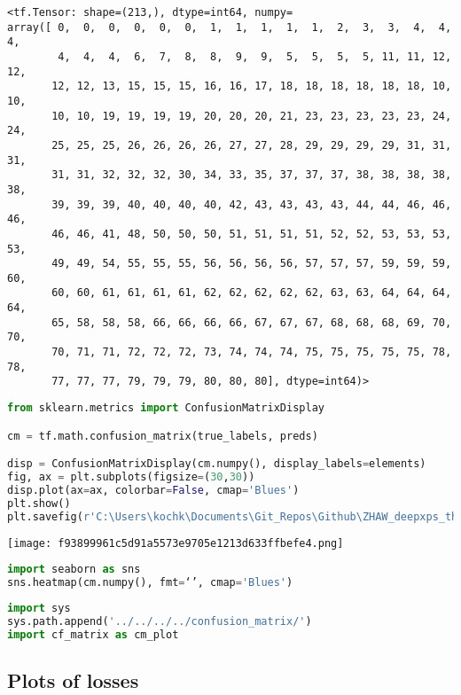 \begin{lstlisting}
<tf.Tensor: shape=(213,), dtype=int64, numpy=
array([ 0,  0,  0,  0,  0,  0,  1,  1,  1,  1,  1,  2,  3,  3,  4,  4,  4,
        4,  4,  4,  6,  7,  8,  8,  9,  9,  5,  5,  5,  5, 11, 11, 12, 12,
       12, 12, 13, 15, 15, 15, 16, 16, 17, 18, 18, 18, 18, 18, 18, 10, 10,
       10, 10, 19, 19, 19, 19, 20, 20, 20, 21, 23, 23, 23, 23, 23, 24, 24,
       25, 25, 25, 26, 26, 26, 26, 27, 27, 28, 29, 29, 29, 29, 31, 31, 31,
       31, 31, 32, 32, 32, 30, 34, 33, 35, 37, 37, 37, 38, 38, 38, 38, 38,
       39, 39, 39, 40, 40, 40, 40, 42, 43, 43, 43, 43, 44, 44, 46, 46, 46,
       46, 46, 41, 48, 50, 50, 50, 51, 51, 51, 51, 52, 52, 53, 53, 53, 53,
       49, 49, 54, 55, 55, 55, 56, 56, 56, 56, 57, 57, 57, 59, 59, 59, 60,
       60, 60, 61, 61, 61, 61, 62, 62, 62, 62, 62, 63, 63, 64, 64, 64, 64,
       65, 58, 58, 58, 66, 66, 66, 66, 67, 67, 67, 68, 68, 68, 69, 70, 70,
       70, 71, 71, 72, 72, 72, 73, 74, 74, 74, 75, 75, 75, 75, 75, 78, 78,
       77, 77, 77, 79, 79, 79, 80, 80, 80], dtype=int64)>
\end{lstlisting}

\begin{lstlisting}[language=Python]
from sklearn.metrics import ConfusionMatrixDisplay

cm = tf.math.confusion_matrix(true_labels, preds)

disp = ConfusionMatrixDisplay(cm.numpy(), display_labels=elements)
fig, ax = plt.subplots(figsize=(30,30))
disp.plot(ax=ax, colorbar=False, cmap='Blues')
plt.show()
plt.savefig(r'C:\Users\kochk\Documents\Git_Repos\Github\ZHAW_deepxps_thesis\Figures\best_task_1_model_CM.png', dpi=300)
\end{lstlisting}

\texttt{[image: f93899961c5d91a5573e9705e1213d633ffbefe4.png]}

\begin{lstlisting}[language=Python]
import seaborn as sns
sns.heatmap(cm.numpy(), fmt=‘’, cmap='Blues')
\end{lstlisting}

\begin{lstlisting}[language=Python]
import sys
sys.path.append('../../../../confusion_matrix/')
import cf_matrix as cm_plot
\end{lstlisting}

\hypertarget{plots-of-losses}{%
\subsection{Plots of losses}\label{plots-of-losses}}

